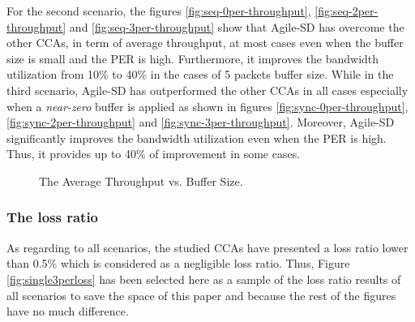 \documentclass[preprint,3p,times,twocolumn,authoryear]{elsarticle}
\begin{document}
For the second scenario, the figures \ref{fig:seq-0per-throughput}, \ref{fig:seq-2per-throughput} and \ref{fig:seq-3per-throughput} show that Agile-SD has overcome the other CCAs, in term of average throughput, at most cases even when the buffer size is small and the PER is high. Furthermore, it improves the bandwidth utilization from 10\% to 40\% in the cases of 5 packets buffer size. While in the third scenario, Agile-SD has outperformed the other CCAs in all cases especially when a \emph{near-zero} buffer is applied as shown in figures \ref{fig:sync-0per-throughput}, \ref{fig:sync-2per-throughput} and \ref{fig:sync-3per-throughput}. Moreover, Agile-SD significantly improves the bandwidth utilization even when the PER is high. Thus, it provides up to 40\% of improvement in some cases.

\begin{figure*}[t!]
	\begin{center}
	\end{center}
	\caption{The Average Throughput vs. Buffer Size.}
	\label{fig:throughput}
\end{figure*}

\subsubsection{The loss ratio}
As regarding to all scenarios, the studied CCAs have presented a loss ratio lower than 0.5\% which is considered as a negligible loss ratio. Thus, Figure \ref{fig:single3perloss} has been selected here as a sample of the loss ratio results of all scenarios to save the space of this paper and because the rest of the figures have no much difference.
\end{document}
